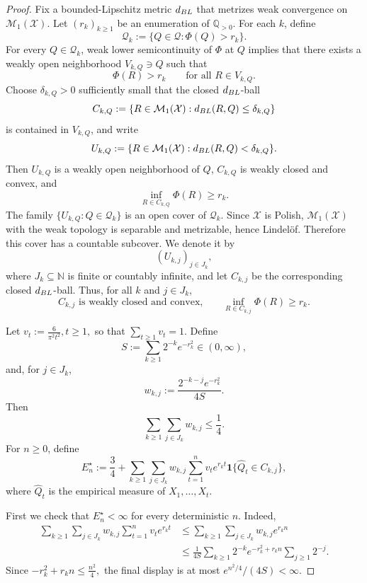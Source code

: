 \documentclass[10pt,a4paper]{amsart}
\begin{document}
\begin{proof}
Fix a bounded-Lipschitz metric \(d_{\rm BL}\) that metrizes weak convergence on
\(\mathcal M_1(\mathcal X)\). Let \((r_k)_{k\ge1}\) be an enumeration of
\(\mathbb Q_{>0}\). For each \(k\), define
\[
  \mathcal Q_k:=\{Q\in\mathcal Q:\Phi(Q)>r_k\}.
\]
For every \(Q\in\mathcal Q_k\), weak lower semicontinuity of \(\Phi\) at \(Q\) implies that there
exists a weakly open neighborhood \(V_{k,Q}\ni Q\) such that
\[
  \Phi(R)>r_k
  \qquad\text{for all }R\in V_{k,Q}.
\]
Choose \(\delta_{k,Q}>0\) sufficiently small that the closed \(d_{\rm BL}\)-ball
\[
  C_{k,Q}:=\{R\in\mathcal M_1(\mathcal X):d_{\rm BL}(R,Q)\le \delta_{k,Q}\}
\]
is contained in \(V_{k,Q}\), and write
\[
  U_{k,Q}:=\{R\in\mathcal M_1(\mathcal X):d_{\rm BL}(R,Q)<\delta_{k,Q}\}.
\]
Then \(U_{k,Q}\) is a weakly open neighborhood of \(Q\), \(C_{k,Q}\) is weakly closed and convex,
and
\[
  \inf_{R\in C_{k,Q}}\Phi(R)\ge r_k.
\]
The family \(\{U_{k,Q}:Q\in\mathcal Q_k\}\) is an open cover of \(\mathcal Q_k\). Since
\(\mathcal X\) is Polish, \(\mathcal M_1(\mathcal X)\) with the weak topology is separable and
metrizable, hence Lindelöf. Therefore this cover has a countable subcover. We denote it by
\[
  (U_{k,j})_{j\in J_k},
\]
where \(J_k\subseteq\mathbb N\) is finite or countably infinite, and let \(C_{k,j}\) be the corresponding
closed \(d_{\rm BL}\)-ball. Thus, for all \(k\) and \(j\in J_k\),
\[
  C_{k,j}\text{ is weakly closed and convex,}
  \qquad
  \inf_{R\in C_{k,j}}\Phi(R)\ge r_k.
\]

Let
\(
  v_t:=\frac{6}{\pi^2t^2},
   t\ge1,
\)
so that \(\sum_{t\ge1}v_t=1\). Define
\[
  S:=\sum_{k\ge1}2^{-k}e^{-r_k^2}\in(0,\infty),
\]
and, for \(j\in J_k\),
\[
  w_{k,j}:=\frac{2^{-k-j}e^{-r_k^2}}{4S}.
\]
Then
\[
  \sum_{k\ge1}\sum_{j\in J_k} w_{k,j}\le \frac14.
\]
For \(n\ge0\), define
\[
  E^\star_n
  :=
  \frac34
  +
  \sum_{k\ge1}\sum_{j\in J_k}
  w_{k,j}\sum_{t=1}^n
  v_t e^{r_kt}\mathbf 1\{\widehat Q_t\in C_{k,j}\},
\]
where \(\widehat Q_t\) is the empirical measure of \(X_1,\ldots,X_t\).

First we check that \(E^\star_n<\infty\) for every deterministic \(n\). Indeed,
\[
\begin{aligned}
  \sum_{k\ge1}\sum_{j\in J_k}
  w_{k,j}\sum_{t=1}^n v_t e^{r_kt}
  &\le
  \sum_{k\ge1}\sum_{j\in J_k}
  w_{k,j} e^{r_kn}  \\
  &\le
  \frac1{4S}
  \sum_{k\ge1}2^{-k}e^{-r_k^2+r_kn}
  \sum_{j\ge1}2^{-j}.
\end{aligned}
\]
Since
\(
  -r_k^2+r_kn\le \frac{n^2}{4},
\)
the final display is at most \(e^{n^2/4}/(4S)<\infty\).


\end{proof}
\end{document}
